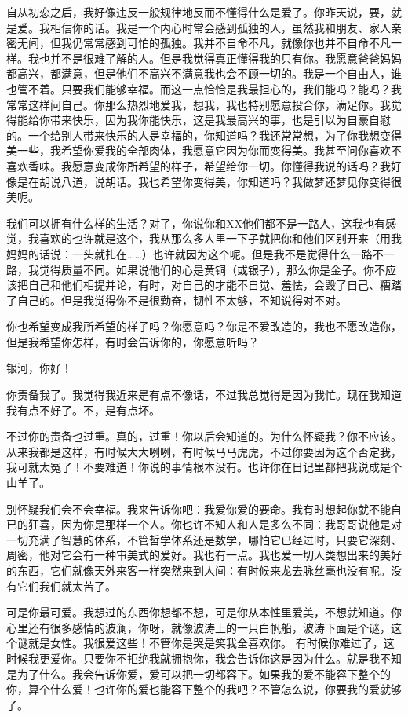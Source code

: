 自从初恋之后，我好像违反一般规律地反而不懂得什么是爱了。你昨天说，要，就是爱。我相信你的话。我是一个内心时常会感到孤独的人，虽然我和朋友、家人亲密无间，但我仍常常感到可怕的孤独。我并不自命不凡，就像你也并不自命不凡一样。我也并不是很难了解的人。但是我觉得真正懂得我的只有你。我愿意爸爸妈妈都高兴，都满意，但是他们不高兴不满意我也会不顾一切的。我是一个自由人，谁也管不着。只要我们能够幸福。而这一点恰恰是我最担心的，我们能吗？能吗？我常常这样问自己。你那么热烈地爱我，想我，我也特别愿意投合你，满足你。我觉得能给你带来快乐，因为我你能快乐，这是我最高兴的事，也是引以为自豪自慰的。一个给别人带来快乐的人是幸福的，你知道吗？我还常常想，为了你我想变得美一些，我希望你爱我的全部肉体，我愿意它因为你而变得美。我甚至问你喜欢不喜欢香味。我愿意变成你所希望的样子，希望给你一切。你懂得我说的话吗？我好像是在胡说八道，说胡话。我也希望你变得美，你知道吗？我做梦还梦见你变得很美呢。 

我们可以拥有什么样的生活？对了，你说你和XX他们都不是一路人，这我也有感觉，我喜欢的也许就是这个，我从那么多人里一下子就把你和他们区别开来（用我妈妈的话说：一头就扎在……）也许就因为这个呢。但是我不是觉得什么一路不一路，我觉得质量不同。如果说他们的心是黄铜（或银子），那么你是金子。你不应该把自己和他们相提并论，有时，对自己的才能不自觉、羞怯，会毁了自己、糟踏了自己的。但是我觉得你不是很勤奋，韧性不太够，不知说得对不对。 

你也希望变成我所希望的样子吗？你愿意吗？你是不爱改造的，我也不愿改造你，但是我希望你怎样，有时会告诉你的，你愿意听吗？ 

银河，你好！ 

你责备我了。我觉得我近来是有点不像话，不过我总觉得是因为我忙。现在我知道我有点不好了。不，是有点坏。 

不过你的责备也过重。真的，过重！你以后会知道的。为什么怀疑我？你不应该。从来我都是这样，有时候大大咧咧，有时候马马虎虎，不过你要因为这个否定我，我可就太冤了！不要难道！你说的事情根本没有。也许你在日记里都把我说成是个山羊了。 

别怀疑我们会不会幸福。我来告诉你吧：我爱你爱的要命。我有时想起你就不能自已的狂喜，因为你是那样一个人。你也许不知人和人是多么不同：我哥哥说他是对一切充满了智慧的体系，不管哲学体系还是数学，哪怕它已经过时，只要它深刻、周密，他对它会有一种审美式的爱好。我也有一点。我也爱一切人类想出来的美好的东西，它们就像天外来客一样突然来到人间：有时候来龙去脉丝毫也没有呢。没有它们我们就太苦了。 

可是你最可爱。我想过的东西你想都不想，可是你从本性里爱美，不想就知道。你心里还有很多感情的波澜，你呀，就像波涛上的一只白帆船，波涛下面是个谜，这个谜就是女性。我很爱这些！不管你是哭是笑我全喜欢你。 有时候你难过了，这时候我更爱你。只要你不拒绝我就拥抱你，我会告诉你这是因为什么。就是我不知是为了什么。我会告诉你爱，爱可以把一切都容下。如果我的爱不能容下整个的你，算个什么爱！也许你的爱也能容下整个的我吧？不管怎么说，你要我的爱就够了。 





